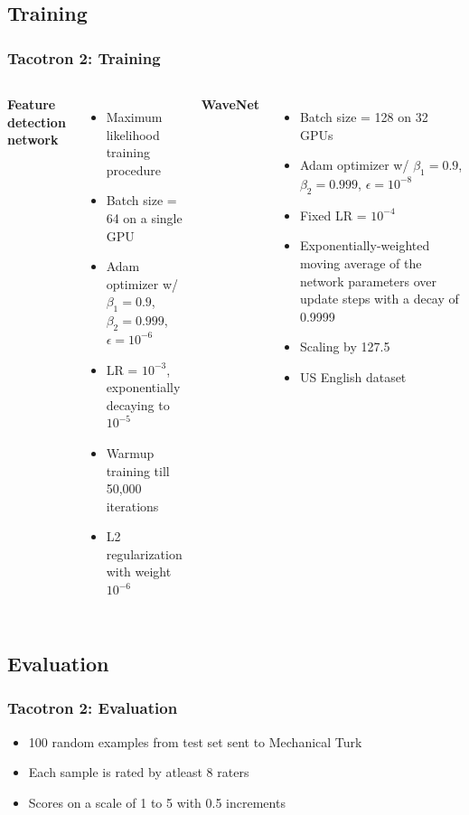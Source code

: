 \documentclass{beamer}
\begin{document}
  \subsection{Training}
  \begin{frame}
    \frametitle{Tacotron 2: Training}
    \begin{columns}
        \textbf{Feature detection network}
        \begin{itemize}
          \item Maximum likelihood training procedure
          \item Batch size = 64 on a single GPU
          \item Adam optimizer w/ $\beta_1=0.9$, $\beta_2=0.999$, $\epsilon=10^{-6}$
          \item LR = $10^{-3}$, exponentially decaying to $10^{-5}$
          \item Warmup training till 50,000 iterations
          \item L2 regularization with weight $10^{-6}$
        \end{itemize}
        \textbf{WaveNet}
        \begin{itemize}
          \item Batch size = 128 on 32 GPUs
          \item Adam optimizer w/ $\beta_1=0.9$, $\beta_2=0.999$, $\epsilon=10^{-8}$
          \item Fixed LR = $10^{-4}$
          \item Exponentially-weighted moving average of the network parameters over update steps with a decay of 0.9999
          \item Scaling by 127.5
          \item US English dataset
        \end{itemize}
    \end{columns}
  \end{frame}

  \subsection{Evaluation}
  \begin{frame}
    \frametitle{Tacotron 2: Evaluation}
    \begin{itemize}
      \item 100 random examples from test set sent to Mechanical Turk
      \item Each sample is rated by atleast 8 raters
      \item Scores on a scale of 1 to 5 with 0.5 increments
    \end{itemize}
  \end{frame}
\end{document}
